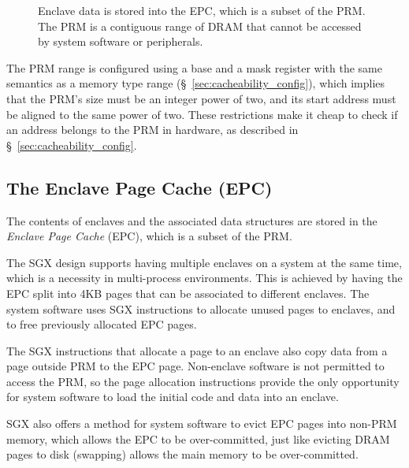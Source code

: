 \begin{figure}[hbt]
  \caption{
    Enclave data is stored into the EPC, which is a subset of the PRM. The
    PRM is a contiguous range of DRAM that cannot be accessed by system
    software or peripherals.
  }
  \label{fig:sgx_epc}
\end{figure}

The PRM range is configured using a base and a mask register with the same
semantics as a memory type range (\S~\ref{sec:cacheability_config}), which
implies that the PRM's size must be an integer power of two, and its start
address must be aligned to the same power of two. These restrictions make it
cheap to check if an address belongs to the PRM in hardware, as described in
\S~\ref{sec:cacheability_config}.


\subsection{The Enclave Page Cache (EPC)}
\label{sec:epc}


The contents of enclaves and the associated data structures are stored in the
\textit{Enclave Page Cache} (EPC), which is a subset of the PRM.

The SGX design supports having multiple enclaves on a system at the same time,
which is a  necessity in multi-process environments. This is achieved by having
the EPC split into 4KB pages that can be associated to different enclaves. The
system software uses SGX instructions to allocate unused pages to enclaves, and
to free previously allocated EPC pages.

The SGX instructions that allocate a page to an enclave also copy data from a
page outside PRM to the EPC page. Non-enclave software is not permitted to
access the PRM, so the page allocation instructions provide the only
opportunity for system software to load the initial code and data into an
enclave.

SGX also offers a method for system software to evict EPC pages into non-PRM
memory, which allows the EPC to be over-committed, just like evicting DRAM
pages to disk (swapping) allows the main memory to be over-committed.


